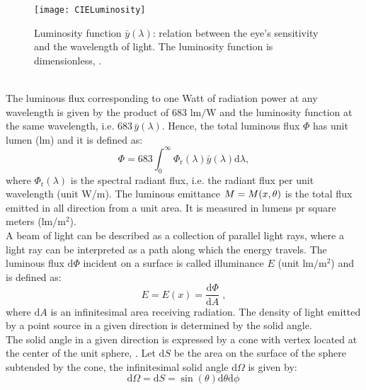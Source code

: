 \begin{figure}[h]
  \begin{center}
  \texttt{[image: CIELuminosity]}
  \end{center}
  \caption{Luminosity function $\bar{y}(\lambda)$: relation between the eye's sensitivity and the wavelength of light. The luminosity function is dimensionless, \cite{wiki}.}
  \label{fig:luminosityfunction}
  \end{figure}
\\ \indent The luminous flux corresponding to one Watt of radiation power at any wavelength is given by the product of $683$ $\textrm{lm/W}$ and the luminosity function at the same wavelength,
i.e. $683 \, \bar{y}(\lambda)$. Hence, the total luminous flux $\Phi$ has unit lumen (\textrm{lm}) and it is defined as:
\begin{equation}
\Phi = 683 \int_0^\infty \Phi_\textrm{r}(\lambda) \bar{y}(\lambda)\textrm{d}\lambda,
\end{equation}
where $\Phi_\textrm{r}(\lambda)$ is the spectral radiant flux, i.e. the radiant flux per unit wavelength (unit \textrm{W}/\textrm{m}). 
The luminous emittance $M = M(x, \theta)$ is the total flux emitted in all direction from a unit area. It is measured in lumens pr square meters (\textrm{lm}/$\textrm{m}^2$).
\\ \indent A beam of light can be described as a collection of parallel light rays, where a light ray can be interpreted as a path along which the energy travels. 
The luminous flux $\textrm{d}\Phi$ incident on a surface is called illuminance $E$ (unit $\textrm{lm}/\textrm{m}^2$)
and is defined as:
\begin{equation}
 E=E(x) = \frac{\textrm{d}\Phi}{\textrm{d}A}\;,
 \end{equation}
 where $\textrm{d}A$ is an infinitesimal area receiving radiation. The density of light emitted by a point source in a given direction is determined by the solid angle.\\ \indent
The solid angle in a given direction is expressed by a cone with vertex located at the center of the unit sphere, \cite{koshel2012illumination}. 
Let $\textrm{d}S$ be the area on the surface of the sphere subtended by the cone,
the infinitesimal solid angle $\textrm{d}\Omega$ is given by:
\begin{equation}\label{solid_angle}
\textrm{d}\Omega = \textrm{d}S= \sin(\theta)\textrm{d}\theta \textrm{d}\phi\,
\end{equation}
